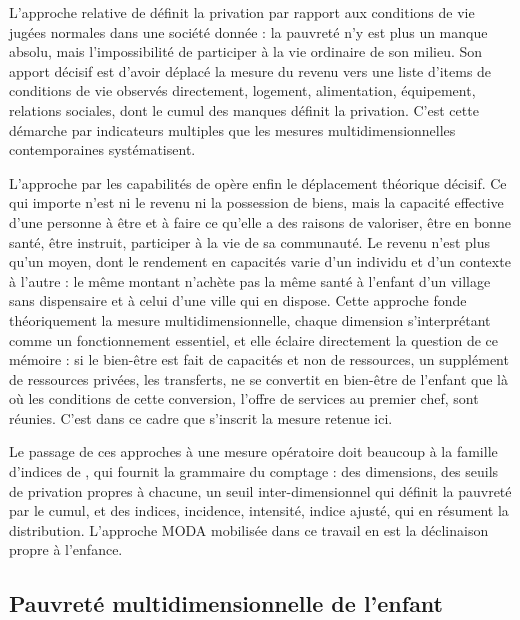 L'approche relative de \textcite{townsend1979} définit la privation par
rapport aux conditions de vie jugées normales dans une société donnée : la
pauvreté n'y est plus un manque absolu, mais l'impossibilité de participer
à la vie ordinaire de son milieu. Son apport décisif est d'avoir déplacé la
mesure du revenu vers une liste d'items de conditions de vie observés
directement, logement, alimentation, équipement, relations sociales, dont
le cumul des manques définit la privation. C'est cette démarche par
indicateurs multiples que les mesures multidimensionnelles contemporaines
systématisent.

L'approche par les capabilités de \textcite{sen1985, sen1999} opère
enfin le déplacement théorique décisif. Ce qui importe n'est ni le revenu
ni la possession de biens, mais la capacité effective d'une personne à
être et à faire ce qu'elle a des raisons de valoriser, être en bonne
santé, être instruit, participer à la vie de sa communauté. Le revenu
n'est plus qu'un moyen, dont le rendement en capacités varie d'un individu
et d'un contexte à l'autre : le même montant n'achète pas la même santé à
l'enfant d'un village sans dispensaire et à celui d'une ville qui en
dispose. Cette approche fonde théoriquement la mesure multidimensionnelle,
chaque dimension s'interprétant comme un fonctionnement essentiel, et elle
éclaire directement la question de ce mémoire : si le bien-être est fait
de capacités et non de ressources, un supplément de ressources privées,
les transferts, ne se convertit en bien-être de l'enfant que là où les
conditions de cette conversion, l'offre de services au premier chef, sont
réunies. C'est dans ce cadre que s'inscrit la mesure retenue ici.

Le passage de ces approches à une mesure opératoire doit beaucoup à la
famille d'indices de \textcite{alkire2011}, qui fournit la grammaire du
comptage : des dimensions, des seuils de privation propres à chacune, un
seuil inter-dimensionnel qui définit la pauvreté par le cumul, et des
indices, incidence, intensité, indice ajusté, qui en résument la
distribution. L'approche MODA mobilisée dans ce travail en est la
déclinaison propre à l'enfance.

\subsection{Pauvreté multidimensionnelle de l'enfant}
\label{subsubsec:concept_moda}

